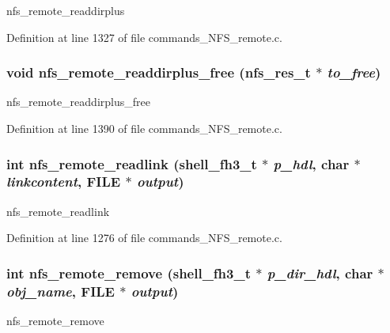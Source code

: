 nfs\_\-remote\_\-readdirplus 

Definition at line 1327 of file commands\_\-NFS\_\-remote.c.
\subsubsection[{nfs\_\-remote\_\-readdirplus\_\-free}]{\setlength{\rightskip}{0pt plus 5cm}void nfs\_\-remote\_\-readdirplus\_\-free (nfs\_\-res\_\-t $\ast$ {\em to\_\-free})}\label{commands__NFS__remote_8c_70a7d1c14b86d53c90b47d472924f652}


nfs\_\-remote\_\-readdirplus\_\-free 

Definition at line 1390 of file commands\_\-NFS\_\-remote.c.
\subsubsection[{nfs\_\-remote\_\-readlink}]{\setlength{\rightskip}{0pt plus 5cm}int nfs\_\-remote\_\-readlink ({\bf shell\_\-fh3\_\-t} $\ast$ {\em p\_\-hdl}, \/  char $\ast$ {\em linkcontent}, \/  FILE $\ast$ {\em output})}\label{commands__NFS__remote_8c_35ee345fd17cf4cf06a364b158c52f6f}


nfs\_\-remote\_\-readlink 

Definition at line 1276 of file commands\_\-NFS\_\-remote.c.
\subsubsection[{nfs\_\-remote\_\-remove}]{\setlength{\rightskip}{0pt plus 5cm}int nfs\_\-remote\_\-remove ({\bf shell\_\-fh3\_\-t} $\ast$ {\em p\_\-dir\_\-hdl}, \/  char $\ast$ {\em obj\_\-name}, \/  FILE $\ast$ {\em output})}\label{commands__NFS__remote_8c_6bf648e474ee81ef7aecebb41c4d107a}


nfs\_\-remote\_\-remove 

